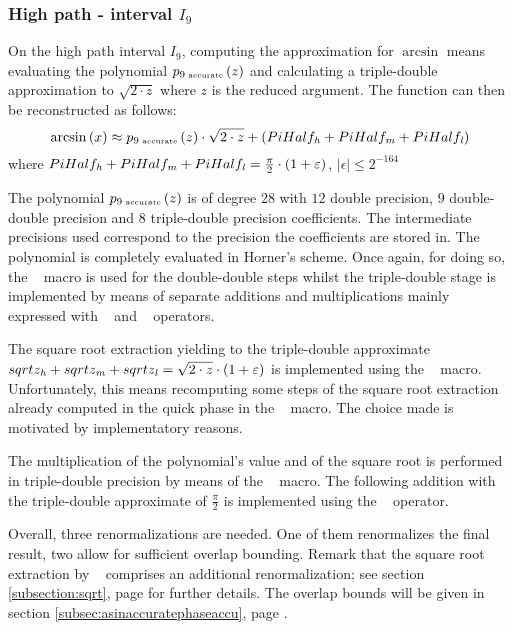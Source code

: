 \subsubsection{High path - interval $I_9$}
On the high path interval $I_9$, computing the approximation for
$\arcsin$ means evaluating the polynomial $p_{9 \mbox{\tiny~accurate}}\left( z \right)$
and calculating a triple-double approximation to $\sqrt{2 \cdot z}$
where $z$ is the reduced argument. The function can then be
reconstructed as follows:
$$\arcsin\left( x \right) \approx p_{9 \mbox{\tiny~accurate}}\left( z \right) \cdot \sqrt{2\cdot z} +
\left( PiHalf_{\mathit{h}} + PiHalf_{\mathit{m}} + PiHalf_{\mathit{l}} \right)$$ where
$PiHalf_{\mathit{h}} + PiHalf_{\mathit{m}} + PiHalf_{\mathit{l}} = \frac{\pi}{2} \cdot \left( 1 +
  \varepsilon \right)$, $\left \vert \epsilon \right \vert \leq 2^{-164}$

The polynomial $p_{9 \mbox{\tiny~accurate}}\left( z \right)$ is of
degree $28$ with $12$ double precision, $9$ double-double precision
and $8$ triple-double precision coefficients. The intermediate
precisions used correspond to the precision the coefficients are
stored in. The polynomial is completely evaluated in Horner's scheme.
Once again, for doing so, the \MulAddDdD~ macro is used for the
double-double steps whilst the triple-double stage is implemented by
means of separate additions and multiplications mainly expressed with
\AddTT~ and \MuldTT~ operators.

The square root extraction yielding to the triple-double approximate
$sqrtz_{\mathit{h}} + sqrtz_{\mathit{m}} + sqrtz_{\mathit{l}} = \sqrt{2 \cdot z } \cdot
\left( 1 + \varepsilon \right)$ is implemented using the \SqrtT~ macro.
Unfortunately, this means recomputing some steps of the square root
extraction already computed in the quick phase in the \SqrtD~ macro.
The choice made is motivated by implementatory reasons.

The multiplication of the polynomial's value and of the square root is
performed in triple-double precision by means of the \MulTT~ macro.
The following addition with the triple-double approximate of
$\frac{\pi}{2}$ is implemented using the \AddTT~ operator.

Overall, three renormalizations are needed. One of them renormalizes
the final result, two allow for sufficient overlap bounding. Remark
that the square root extraction by \SqrtT~ comprises an additional
renormalization; see section \ref{subsection:sqrt}, page
\pageref{subsection:sqrt} for further details.  The overlap bounds
will be given in section \ref{subsec:asinaccuratephaseaccu}, page
\pageref{subsec:asinaccuratephaseaccu}.

